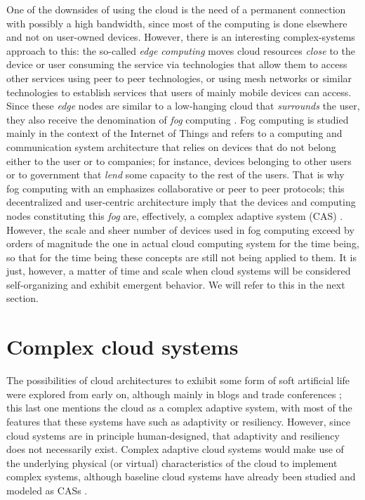 \documentclass[utf8]{frontiersSCNS} %
\begin{document}
One of the downsides of using the cloud is the need of a permanent connection
with possibly a high bandwidth, since most of the computing is done
elsewhere and not on user-owned devices. However, there is
an interesting complex-systems approach to this: the so-called {\em edge
computing} \citep{shi2016edge} moves cloud resources {\em close} to
the device or user consuming the service via technologies that allow them to access other
services using peer to peer technologies, or using mesh networks or
similar technologies to establish services that users of mainly mobile
devices can access. Since these {\em edge} nodes are similar to a
low-hanging cloud that {\em surrounds} the
user, they also receive the denomination of {\em fog} computing
\citep{luan2015fog}. Fog computing is studied mainly in the context of the Internet
of Things and refers to a computing and communication system
architecture that relies on devices that do not belong either to the
user or to companies; for instance, devices belonging to other users
or to government that {\em lend} some capacity to the rest of the
users. That is why fog computing with an emphasizes  collaborative or peer to
peer protocols; this decentralized and user-centric architecture imply
that the devices and computing nodes constituting this {\em fog}
are, effectively, a complex adaptive system (CAS)
\citep{yan2010application,roca2018tackling}. However, the scale and sheer
number of devices used in fog computing exceed by orders of magnitude
the one in actual cloud computing system for the time being, so that
for the time being these concepts are still not being applied to
them. It is just, however, a matter of time and scale when cloud
systems will be considered self-organizing and exhibit emergent
behavior. We will refer to this in the next section.


\section{Complex cloud systems }

The possibilities of cloud architectures to exhibit some form of soft
artificial life were explored from early on, although mainly in blogs
and trade conferences \citep{burela09:Azure,hakimi}; this last one
mentions the cloud as a complex adaptive system, with most of the
features that these systems have such as adaptivity or resiliency.
However, since cloud systems are in principle
human-designed, that adaptivity and resiliency does not necessarily
exist. Complex adaptive cloud systems would make use of the underlying physical (or
virtual) characteristics of the cloud to implement complex
systems, although baseline cloud systems have already been studied and
modeled as CASs \citep{chen2013cloud}.
\end{document}
